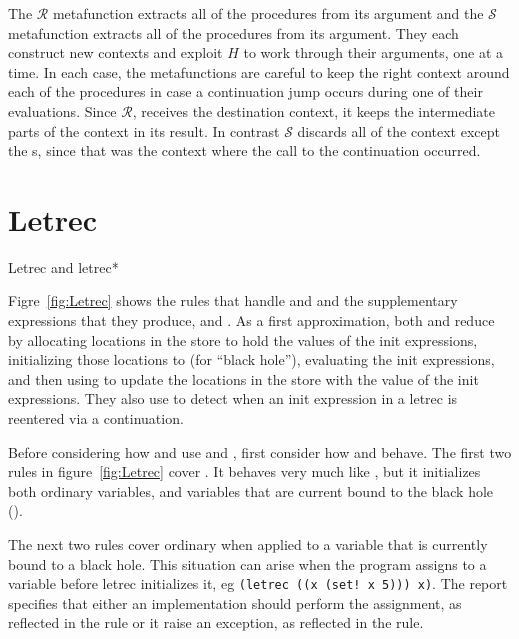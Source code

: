 The $\mathscr{R}$ metafunction extracts all of the 
procedures from its argument and the $\mathscr{S}$ metafunction extracts all of the  procedures from its argument. They each construct new contexts and exploit
$H$ to work through their arguments, one  at a time.
In each case, the metafunctions are careful to keep the right
 context around each of the procedures in case a continuation
jump occurs during one of their evaluations.
Since $\mathscr{R}$,
receives the destination context, it keeps the intermediate
parts of the context in its result.
In contrast
$\mathscr{S}$ discards all of the context except the s,
since that was the context where the call to the
continuation occurred.

\section{Letrec}

\beginfig
\begin{center}

\end{center}
\caption{Letrec and letrec*}
\label{fig:Letrec}
\endfig

Figre~\ref{fig:Letrec} shows the rules that handle  and  and the supplementary expressions that they produce,  and . As a first approximation, both  and  reduce by allocating locations in the store to hold the values of the init expressions, initializing those locations to  (for ``black hole''), evaluating the init expressions, and then using  to update the locations in the store with the value of the init expressions. They also use  to detect when an init expression in a letrec is reentered via a continuation.

Before considering how  and  use  and , first consider how  and  behave. The first two rules in figure~\ref{fig:Letrec} cover . It behaves very much like , but it initializes both ordinary variables, and variables that are current bound to the black hole ().

The next two rules cover ordinary  when applied to a variable
that is currently bound to a black hole. This situation can arise when
the program assigns to a variable before letrec initializes it, eg
\verb|(letrec ((x (set! x 5))) x)|. The report specifies that either
an implementation should perform the assignment, as reflected in the
 rule or it raise an exception, as reflected in the  rule.

